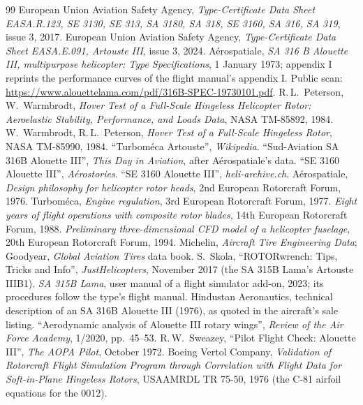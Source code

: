 \documentclass[10pt,a4paper,twocolumn]{article}
\begin{document}
\begin{thebibliography}{99}\small
{} European Union Aviation Safety Agency, \emph{Type-Certificate Data Sheet EASA.R.123, SE 3130, SE 313, SA 3180, SA 318, SE 3160, SA 316, SA 319}, issue 3, 2017.
 European Union Aviation Safety Agency, \emph{Type-Certificate Data Sheet EASA.E.091, Artouste III}, issue 3, 2024.
 A\'erospatiale, \emph{SA 316 B Alouette III, multipurpose helicopter: Type Specifications}, 1 January 1973; appendix I
reprints the performance curves of the flight manual's appendix I. Public scan:
\url{https://www.alouettelama.com/pdf/316B-SPEC-19730101.pdf}.
 R.\,L.\ Peterson, W.\ Warmbrodt, \emph{Hover Test of a Full-Scale Hingeless Helicopter Rotor: Aeroelastic Stability,
Performance, and Loads Data}, NASA TM-85892, 1984.
 W.\ Warmbrodt, R.\,L.\ Peterson, \emph{Hover Test of a Full-Scale Hingeless Rotor}, NASA TM-85990, 1984.
 ``Turbom\'eca Artouste'', \emph{Wikipedia}.
 ``Sud-Aviation SA 316B Alouette III'', \emph{This Day in Aviation}, after A\'erospatiale's data.
 ``SE 3160 Alouette III'', \emph{A\'erostories}.
 ``SE 3160 Alouette III'', \emph{heli-archive.ch}.
 A\'erospatiale, \emph{Design philosophy for helicopter rotor heads}, 2nd European Rotorcraft Forum, 1976.
 Turbom\'eca, \emph{Engine regulation}, 3rd European Rotorcraft Forum, 1977.
 \emph{Eight years of flight operations with composite rotor blades}, 14th European Rotorcraft Forum, 1988.
 \emph{Preliminary three-dimensional CFD model of a helicopter fuselage}, 20th European Rotorcraft Forum, 1994.
 Michelin, \emph{Aircraft Tire Engineering Data}; Goodyear, \emph{Global Aviation Tires} data book.
 S.\ Skola, ``ROTORwrench: Tips, Tricks and Info'', \emph{JustHelicopters}, November 2017 (the SA 315B Lama's Artouste IIIB1).
 \emph{SA 315B Lama}, user manual of a flight simulator add-on, 2023; its procedures follow the type's flight manual.
 Hindustan Aeronautics, technical description of an SA 316B Alouette III (1976), as quoted in the aircraft's sale listing.
 ``Aerodynamic analysis of Alouette III rotary wings'', \emph{Review of the Air Force Academy}, 1/2020, pp.\ 45--53.
 R.\,W.\ Sweazey, ``Pilot Flight Check: Alouette III'', \emph{The AOPA Pilot}, October 1972.
 Boeing Vertol Company, \emph{Validation of Rotorcraft Flight Simulation Program through Correlation with Flight Data for Soft-in-Plane Hingeless Rotors}, USAAMRDL TR 75-50, 1976 (the C-81 airfoil equations for the 0012).

\end{thebibliography}
\end{document}
